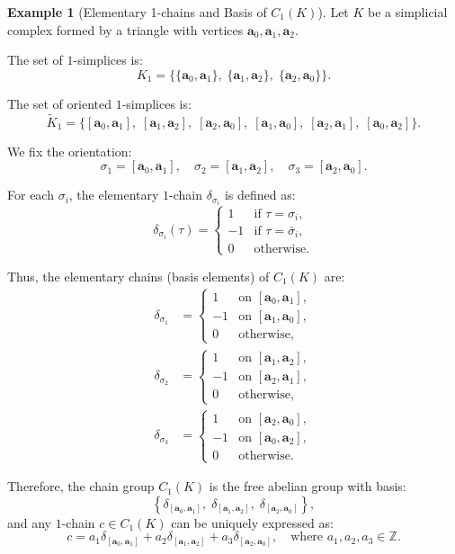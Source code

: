 \documentclass[12pt,oneside,reqno]{amsart}
\theoremstyle{plain}
\theoremstyle{definition}
\newtheorem{example}{Example}[section]
\theoremstyle{remark}
\newcommand{\0}{{\textbf{0}}}
\begin{document}
\begin{example}[Elementary 1-chains and Basis of $C_1(K)$]
Let $K$ be a simplicial complex formed by a triangle with vertices 
$\mathbf{a}_0, \mathbf{a}_1, \mathbf{a}_2$.

The set of $1$-simplices is:
\[
K_1 = \{ \{ \mathbf{a}_0, \mathbf{a}_1 \},\; \{ \mathbf{a}_1, \mathbf{a}_2 \},\; \{ \mathbf{a}_2, \mathbf{a}_0 \} \}.
\]

The set of oriented $1$-simplices is:
\[
\widetilde{K}_1 = \{ 
[\mathbf{a}_0, \mathbf{a}_1],\;
[\mathbf{a}_1, \mathbf{a}_2],\;
[\mathbf{a}_2, \mathbf{a}_0],\;
[\mathbf{a}_1, \mathbf{a}_0],\;
[\mathbf{a}_2, \mathbf{a}_1],\;
[\mathbf{a}_0, \mathbf{a}_2]
\}.
\]

We fix the orientation:
\[
\sigma_1 = [\mathbf{a}_0, \mathbf{a}_1],\quad
\sigma_2 = [\mathbf{a}_1, \mathbf{a}_2],\quad
\sigma_3 = [\mathbf{a}_2, \mathbf{a}_0].
\]

For each $\sigma_i$, the elementary $1$-chain $\delta_{\sigma_i}$ is defined as:
\[
\delta_{\sigma_i}(\tau) = 
\begin{cases}
1 & \text{if } \tau = \sigma_i, \\
-1 & \text{if } \tau = \bar{\sigma}_i, \\
0 & \text{otherwise}.
\end{cases}
\]

Thus, the elementary chains (basis elements) of $C_1(K)$ are:
\begin{align*}
\delta_{\sigma_1} &= 
\begin{cases}
1 & \text{on } [\mathbf{a}_0, \mathbf{a}_1], \\
-1 & \text{on } [\mathbf{a}_1, \mathbf{a}_0], \\
0 & \text{otherwise},
\end{cases} \\
\delta_{\sigma_2} &= 
\begin{cases}
1 & \text{on } [\mathbf{a}_1, \mathbf{a}_2], \\
-1 & \text{on } [\mathbf{a}_2, \mathbf{a}_1], \\
0 & \text{otherwise},
\end{cases} \\
\delta_{\sigma_3} &= 
\begin{cases}
1 & \text{on } [\mathbf{a}_2, \mathbf{a}_0], \\
-1 & \text{on } [\mathbf{a}_0, \mathbf{a}_2], \\
0 & \text{otherwise}.
\end{cases}
\end{align*}

Therefore, the chain group $C_1(K)$ is the free abelian group with basis:
\[
\left\{ \delta_{[\mathbf{a}_0, \mathbf{a}_1]},\; \delta_{[\mathbf{a}_1, \mathbf{a}_2]},\; \delta_{[\mathbf{a}_2, \mathbf{a}_0]} \right\},
\]
and any $1$-chain $c \in C_1(K)$ can be uniquely expressed as:
\[
c = a_1 \delta_{[\mathbf{a}_0, \mathbf{a}_1]} + a_2 \delta_{[\mathbf{a}_1, \mathbf{a}_2]} + a_3 \delta_{[\mathbf{a}_2, \mathbf{a}_0]}, \quad \text{where } a_1, a_2, a_3 \in \mathbb{Z}.
\]
\end{example}
\end{document}
